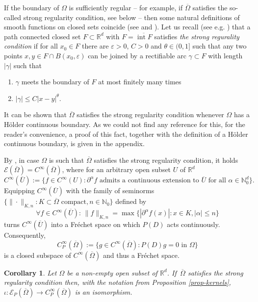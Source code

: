 \documentclass[10pt,leqno]{amsart}
\newtheorem{corollary}[prop]{Corollary}
\theoremstyle{definition}
\newcommand{\R}{\mathbb R}
\newcommand{\N}{\mathbb N}
\let\epsilon\varepsilon
\begin{document}
If the boundary of $\Omega$ is sufficiently regular -- for example, if $\overline{\Omega}$ satisfies the so-called strong regularity condition, see below -- then some natural definitions of smooth functions on closed sets coincide (see \cite[Lemma 1.10]{Rainer2019} and \cite[Proposition 2.16]{Bierstone1980}).
Let us recall (see e.g. \cite[$(2.16.1)$]{Bierstone1980}) that a path connected closed set $F\subset\R^d$ with $F=\overline{\operatorname{int}F}$ satisfies \emph{the strong regurality condition} if
for all $x_0\in F$ there are $\epsilon>0$, $C>0$ and $\theta\in(0,1]$ such that any two points $x,y\in F\cap B(x_0,\epsilon)$ can be joined by a rectifiable arc $\gamma\subset F$ with length $|\gamma|$ such that 
\begin{enumerate}
	\item $\gamma$ meets the boundary of $F$ at most finitely many times
	\item $|\gamma|\leq C|x-y|^{\theta}$.
\end{enumerate}
It can be shown that $\overline{\Omega}$ satisfies the strong regularity condition whenever $\Omega$ has a H\"older continuous boundary. As we could not find any reference for this, for the reader's convenience, a proof of this fact, together with the definition of a H\"older continuous boundary, is given in the appendix.

By \cite[Proposition 2.16]{Bierstone1980}, in case $\Omega$ is such that $\overline{\Omega}$ satisfies the strong regularity condition, it holds $\mathscr{E}(\overline{\Omega})=C^\infty(\overline{\Omega})$, where for an arbitrary open subset $U$ of $\R^d$ 
$$C^\infty(\overline{U}):=\{f\in C^\infty(U)\colon \partial^\alpha f\text{ admits a continuous extension to }\overline{U}\text{ for all }\alpha\in\N_0^d\}.$$
Equipping $C^\infty(\overline{U})$ with the family of seminorms $\{\|\cdot\|_{K,n}\colon K\subset\overline{\Omega}\text{ compact}, n\in\N_0\}$ defined by
$$\forall f\in C^\infty(\overline{U})\colon\,\|f\|_{K,n}=\max\{|\partial^\alpha f(x)|\colon x\in K, |\alpha|\leq n\}$$
turns $C^\infty(\overline{U})$ into a Fr\'echet space on which $P(D)$ acts continuously. Consequently, 
$$C^\infty_P(\overline{\Omega}):=\{g\in C^\infty(\overline{\Omega})\colon P(D)g=0\text{ in }\Omega\}$$
is a closed subspace of $C^\infty(\overline{\Omega})$ and thus a Fr\'echet space.

\begin{corollary}\label{cor-kernels}
	Let $\Omega$ be a non-empty open subset of $\R^d$. If\, $\overline{\Omega}$ satisfies the strong regularity condition then, with the notation from Proposition \ref{prop-kernels}, $\iota\colon\mathscr{E}_P(\overline\Omega)\to C^\infty_P(\overline{\Omega})$ is an isomorphism.
\end{corollary}
\end{document}
